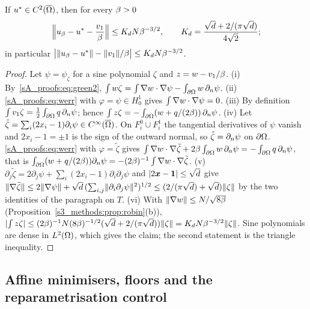\begin{theorem}\label{sA_proofs:thm:first}
If $u^{*}\in C^2(\overline{\Omega})$, then for every $\beta>0$
\[
\Bigl\lVert u_{\beta}-u^{*}-\frac{v_1}{\beta}\Bigr\rVert\le K_dN\beta^{-3/2},\qquad
K_d=\frac{\sqrt d+2/(\pi\sqrt d)}{4\sqrt2};
\]
in particular $\bigl|\lVert u_{\beta}-u^{*}\rVert-\lVert v_1\rVert/\beta\bigr|\le K_dN\beta^{-3/2}$.
\end{theorem}
\begin{proof}
Let $\psi=\psi_\zeta$ for a sine polynomial $\zeta$ and $z=w-v_1/\beta$.
(i) By~\eqref{sA_proofs:eq:green2}, $\int w\zeta=\int\nabla w\cdot\nabla\psi-\int_{\partial\Omega}w\,\partial_n\psi$.
(ii) \eqref{sA_proofs:eq:werr} with $\varphi=\psi\in H^1_0$ gives $\int\nabla w\cdot\nabla\psi=0$.
(iii) By definition $\int v_1\zeta=\frac12\int_{\partial\Omega}q\,\partial_n\psi$; hence
$\int z\zeta=-\int_{\partial\Omega}(w+q/(2\beta))\,\partial_n\psi$.
(iv) Let $\tilde\zeta=\sum_i(2x_i-1)\partial_i\psi\in C^\infty(\overline{\Omega})$. On $F_i^0\cup F_i^1$ the
tangential derivatives of $\psi$ vanish and $2x_i-1=\pm1$ is the sign of the outward normal, so
$\tilde\zeta=\partial_n\psi$ on $\partial\Omega$. \eqref{sA_proofs:eq:werr} with $\varphi=\tilde\zeta$ gives
$\int\nabla w\cdot\nabla\tilde\zeta+2\beta\int_{\partial\Omega}w\,\partial_n\psi=-\int_{\partial\Omega}q\,\partial_n\psi$, that is
$\int_{\partial\Omega}(w+q/(2\beta))\partial_n\psi=-(2\beta)^{-1}\int\nabla w\cdot\nabla\tilde\zeta$.
(v) $\partial_j\tilde\zeta=2\partial_j\psi+\sum_i(2x_i-1)\partial_i\partial_j\psi$ and
$\lvert 2\boldsymbol{x}-\mathbf1\rvert\le\sqrt d$ give
$\lVert \nabla\tilde\zeta\rVert\le2\lVert \nabla\psi\rVert+\sqrt d\,(\sum_{i,j}\lVert \partial_i\partial_j\psi\rVert^2)^{1/2}\le(2/(\pi\sqrt d)+\sqrt d)\lVert \zeta\rVert$
by the two identities of the paragraph on $T$.
(vi) With $\lVert \nabla w\rVert\le N/\sqrt{8\beta}$ (Proposition~\ref{s3_methods:prop:robin}(b)),
$\lvert \int z\zeta\rvert\le(2\beta)^{-1}N(8\beta)^{-1/2}(\sqrt d+2/(\pi\sqrt d))\lVert \zeta\rVert=K_dN\beta^{-3/2}\lVert \zeta\rVert$.
Sine polynomials are dense in $L^2(\Omega)$, which gives the claim; the second statement is the
triangle inequality.
\end{proof}

\subsection{Affine minimisers, floors and the reparametrisation control}\label{sA_proofs:sec:remedies}

